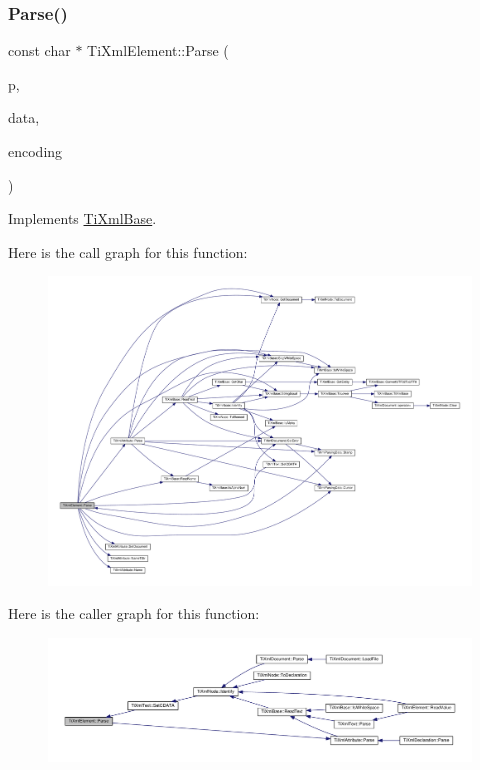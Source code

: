 \subsubsection{\texorpdfstring{Parse()}{Parse()}}
{\footnotesize\ttfamily const char $\ast$ Ti\+Xml\+Element\+::\+Parse (\begin{DoxyParamCaption}\item[{const char $\ast$}]{p,  }\item[{\hyperlink{class_ti_xml_parsing_data}{Ti\+Xml\+Parsing\+Data} $\ast$}]{data,  }\item[{\hyperlink{tinyxml_8h_a88d51847a13ee0f4b4d320d03d2c4d96}{Ti\+Xml\+Encoding}}]{encoding }\end{DoxyParamCaption})\hspace{0.3cm}{\ttfamily [virtual]}}



Implements \hyperlink{class_ti_xml_base_a00e4edb0219d00a1379c856e5a1d2025}{Ti\+Xml\+Base}.

Here is the call graph for this function\+:
\nopagebreak
\begin{figure}[H]
\begin{center}
\leavevmode
\includegraphics[width=350pt]{class_ti_xml_element_af95c9165159fd9dfdcc5b894a3fcf85b_cgraph}
\end{center}
\end{figure}
Here is the caller graph for this function\+:
\nopagebreak
\begin{figure}[H]
\begin{center}
\leavevmode
\includegraphics[width=350pt]{class_ti_xml_element_af95c9165159fd9dfdcc5b894a3fcf85b_icgraph}
\end{center}
\end{figure}
\mbox{\label{class_ti_xml_element_aa31a15cddfb8601a31236fe7d2569fb4}} 
